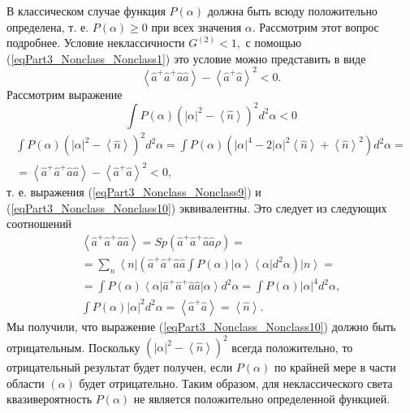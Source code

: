 В классическом случае функция $P\left(\alpha\right)$ должна быть всюду
положительно определена, т. е. $P\left(\alpha\right) \ge 0$ при всех
значения $\alpha$. Рассмотрим этот вопрос подробнее. Условие
неклассичности 
\(
G^{(2)} < 1, 
\)
с помощью (\ref{eqPart3_Nonclass_Nonclass1}) это условие
можно представить в виде
\begin{equation}
\left<\hat{a}^{+}\hat{a}^{+}\hat{a}\hat{a}\right> -
\left<\hat{a}^{+}\hat{a}\right>^2 < 0.
\label{eqPart3_Nonclass_Nonclass9}
\end{equation}
Рассмотрим выражение
\begin{equation}
\int P\left(\alpha\right)\left(\left|\alpha\right|^2 -
\left<\hat{n}\right>\right)^2 d^2\alpha < 0
\label{eqPart3_Nonclass_Nonclass10}
\end{equation}
\begin{eqnarray}
\int P\left(\alpha\right)\left(\left|\alpha\right|^2 -
\left<\hat{n}\right>\right)^2 d^2\alpha = 
\int P\left(\alpha\right)\left(\left|\alpha\right|^4 -
2\left|\alpha\right|^2 \left<\hat{n}\right> +
\left<\hat{n}\right>^2\right) d^2\alpha = 
\nonumber \\
=
\left<\hat{a}^{+}\hat{a}^{+}\hat{a}\hat{a}\right> -
\left<\hat{a}^{+}\hat{a}\right>^2 < 0,
\nonumber
\end{eqnarray}
т. е. выражения (\ref{eqPart3_Nonclass_Nonclass9}) и
(\ref{eqPart3_Nonclass_Nonclass10}) эквивалентны. Это следует из
следующих соотношений
\begin{eqnarray}
  \left<\hat{a}^{+}\hat{a}^{+}\hat{a}\hat{a}\right> = Sp \left(
  \hat{a}^{+}\hat{a}^{+}\hat{a}\hat{a} \rho \right)=
  \nonumber \\
  =
  \sum_n \left<n\right|\left(\hat{a}^{+}\hat{a}^{+}\hat{a}\hat{a}
  \int P\left(\alpha\right)
  \left|\alpha\right>\left<\alpha\right|d^2\alpha
  \right)
  \left|n\right> =
  \nonumber \\
  =
  \int P\left(\alpha\right)
  \left<\alpha\right|\hat{a}^{+}\hat{a}^{+}\hat{a}\hat{a}\left|\alpha\right>
  d^2\alpha = 
\int P\left(\alpha\right)\left|\alpha\right|^4 d^2\alpha,
\nonumber \\
\int P\left(\alpha\right)\left|\alpha\right|^2 d^2\alpha = 
\left<\hat{a}^{+}\hat{a}\right> = \left<\hat{n}\right>.
\nonumber
\end{eqnarray}
Мы получили, что выражение (\ref{eqPart3_Nonclass_Nonclass10}) должно
быть отрицательным. Поскольку 
\(
\left(\left|\alpha\right|^2 -
\left<\hat{n}\right>\right)^2
\)
всегда положительно, то отрицательный результат будет получен, если 
$P\left(\alpha\right)$ по крайней мере в части области $(\alpha)$
будет отрицательно. Таким образом, для неклассического света
квазивероятность $P\left(\alpha\right)$ не является положительно
определенной функцией.

